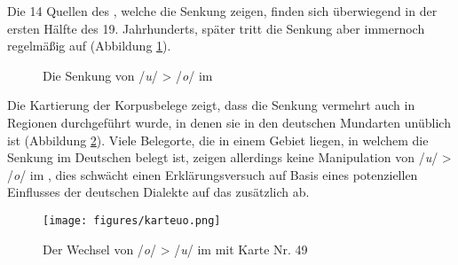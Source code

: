 Die 14 Quellen des , welche die Senkung zeigen, finden sich überwiegend in der ersten Hälfte des 19. Jahrhunderts, später tritt die Senkung aber immernoch regelmäßig auf (Abbildung \ref{histou_o}).


\begin{figure}
 \fittable{
	\begin{tikzpicture}
		\begin{axis}[only marks, width=0.82\textwidth,height=0.2\textheight,
		legend style={at={(1,1)},xshift=+0.2cm, yshift=-0.6cm,anchor=north west,nodes=left},
			xtick={1700, 1725, 1750, 1775, 1800, 1825, 1850, 1875, 1900, 1925, 1950, 1975}, ytick=\empty,
			x tick label style={/pgf/number format/1000 sep=}, 
			y tick label style={/pgf/number format/1000 sep=},
			extra y tick style={grid=major,
				tick label style={, ,}},
				ymin=0.7,
				ymax=2.9,
			ylabel={Phänomenbelege},
			enlarge x limits=0.03]	
	
			
\addplot [mark=*, black] table [x=jahr, y=phaen] {figures/u_o.txt};%

\addplot [mark=o, black] table [x=jahr, y=no] {figures/u_o_no.txt};%


 

						\legend{Senkung /\textit{u}/ > /\textit{o}/, unmanipuliert} %
		\end{axis}
	\end{tikzpicture}
}
	\caption{Die Senkung von /\textit{u}/ > /\textit{o}/ im }
	\label{histou_o}	
\end{figure}



Die Kartierung der Korpusbelege zeigt, dass die Senkung vermehrt auch in Regionen durchgeführt wurde, in denen sie in den deutschen Mundarten unüblich ist (Abbildung \ref{karteuo}). Viele Belegorte, die in einem Gebiet liegen, in welchem die Senkung im Deutschen belegt ist, zeigen allerdings keine Manipulation von /\textit{u}/ > /\textit{o}/ im , dies schwächt einen Erklärungsversuch auf Basis eines potenziellen Einflusses der deutschen Dialekte auf das  zusätzlich ab.  
 
  \begin{figure}
		\centering
\texttt{[image: figures/karteuo.png]}
		\caption{\label{karteuo} Der Wechsel von /\textit{o}/ > /\textit{u}/ im  mit  Karte Nr. 49}
		\end{figure}



